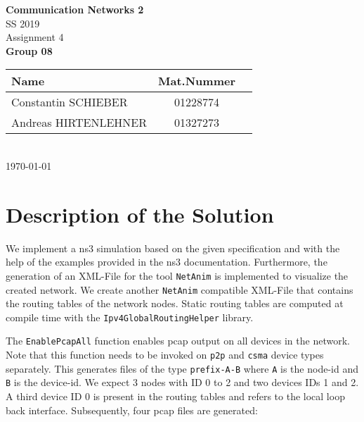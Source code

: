 \documentclass[parskip=full]{scrartcl}
\begin{document}
\begin{titlepage}
    \centering
    \vspace*{2cm}
    {\Huge \textbf{Communication Networks 2}}\\
    SS 2019\\
    \vspace*{1cm}
    {\Large Assignment 4}
    \\\vspace*{3cm}
    {\Large \textbf{Group 08}}\\
    \vspace*{1cm}
    {\large 
        \begin{tabular}{l c c}
            Name & Mat.Nummer \\ \hline
            Constantin SCHIEBER & 01228774 \\
            Andreas HIRTENLEHNER & 01327273
        \end{tabular}
    }
    \\\vspace*{7cm}
    \today
\end{titlepage}


\section{Description of the Solution}

We implement a ns3 simulation based on the given specification and with the help of the examples provided in the ns3 documentation.
Furthermore, the generation of an XML-File for the tool \texttt{NetAnim} is implemented to visualize the created network.
We create another \texttt{NetAnim} compatible XML-File that contains the routing tables of the network nodes.
Static routing tables are computed at compile time with the \texttt{Ipv4GlobalRoutingHelper} library.

The \texttt{EnablePcapAll} function enables pcap output on all devices in the network. 
Note that this function needs to be invoked on \texttt{p2p} and \texttt{csma} device types separately.
This generates files of the type \texttt{prefix-A-B} where \texttt{A} is the node-id and \texttt{B} is the device-id. 
We expect 3 nodes with ID 0 to 2 and two devices IDs 1 and 2. 
A third device ID 0 is present in the routing tables and refers to the local loop back interface. 
Subsequently, four pcap files are generated:
\end{document}
